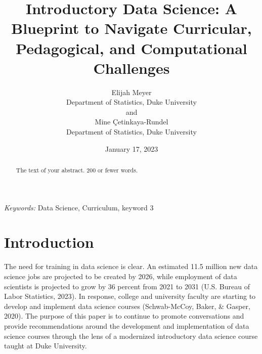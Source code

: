 \documentclass[
  12pt]{article}
\begin{document}
\def\spacingset#1{\renewcommand{\baselinestretch}%
{#1}\small\normalsize} \spacingset{1}



\date{January 17, 2023}
\title{\bf Introductory Data Science: A Blueprint to Navigate
Curricular, Pedagogical, and Computational Challenges}
\author{
Elijah Meyer\\
Department of Statistics, Duke University\\
and\\Mine Çetinkaya-Rundel\\
Department of Statistics, Duke University\\
}
\maketitle

\bigskip
\bigskip
\begin{abstract}
The text of your abstract. 200 or fewer words.
\end{abstract}

\noindent%
{\it Keywords:} Data Science, Curriculum, keyword 3
\vfill

\newpage
\spacingset{1.9} %
\ifdefined\Shaded\renewenvironment{Shaded}{\begin{tcolorbox}[interior hidden, sharp corners, frame hidden, borderline west={3pt}{0pt}{shadecolor}, enhanced, boxrule=0pt, breakable]}{\end{tcolorbox}}\fi

\hypertarget{sec-intro}{%
\section{Introduction}\label{sec-intro}}

The need for training in data science is clear. An estimated 11.5
million new data science jobs are projected to be created by 2026, while
employment of data scientists is projected to grow by 36 percent from
2021 to 2031 (U.S. Bureau of Labor Statistics, 2023). In response,
college and university faculty are starting to develop and implement
data science courses (Schwab-McCoy, Baker, \& Gasper, 2020). The purpose
of this paper is to continue to promote conversations and provide
recommendations around the development and implementation of data
science courses through the lens of a modernized introductory data
science course taught at Duke University.
\end{document}
